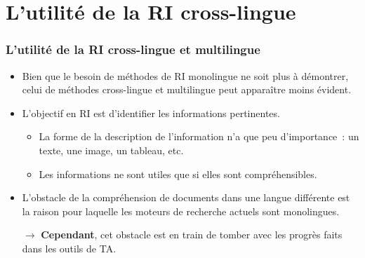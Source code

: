 \documentclass[12pt,aspectratio=43,dvipsnames,table]{beamer}
\begin{document}
\section{L'utilité de la RI cross-lingue}


\begin{frame}
    \frametitle{L'utilité de la RI cross-lingue et multilingue}
    \begin{itemize} \itemsep10pt
        \item Bien que le besoin de méthodes de RI monolingue ne soit plus à 
              démontrer, celui de méthodes cross-lingue et multilingue 
              peut apparaître moins évident.
        \item L'objectif en RI est d'identifier les informations pertinentes.
        \begin{itemize}
            \item La forme de la description de l'information n'a que peu
                  d'importance~: un texte, une image, un tableau, etc.
            \item Les informations ne sont utiles que si elles sont 
                  compréhensibles.
        \end{itemize}
        \item L'obstacle de la compréhension de documents dans une langue 
              différente est la raison pour laquelle les moteurs de recherche 
              actuels sont monolingues.
        \item[$\to$] \textbf{Cependant}, cet obstacle est en train de tomber 
                     avec les progrès faits dans les outils de TA.
    \end{itemize}
\end{frame}
\end{document}

